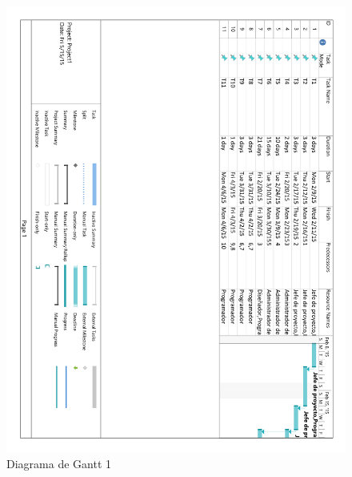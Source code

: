 \begin{figure}[!htp]
	\centering
	\includegraphics[page=1, scale=.7]{fig/gantt_diagram}
	\caption{Diagrama de Gantt 1}
\end{figure}

